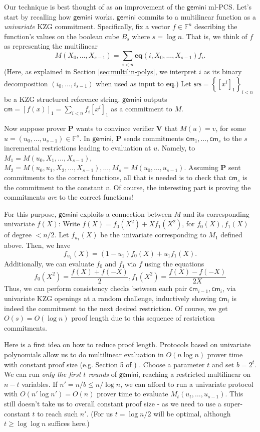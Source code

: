 \documentclass[11pt]{article} %
\newcommand{\gemini}{\ensuremath{\mathsf{gemini}}\xspace}
\newcommand{\F}{\ensuremath{\mathbb F}\xspace}
\newcommand{\srs}{\ensuremath{\mathsf{srs}}\xspace}
\newcommand{\cm}{\ensuremath{\mathsf{cm}}\xspace}
\newcommand{\sett}[2]{\ensuremath{\set{#1}_{#2}}\xspace}
\newcommand{\enc}[1]{\ensuremath{\left[#1\right]_1}\xspace}
\newcommand{\prv}{\ensuremath{\mathsf{\mathbf{P}}}\xspace}
\newcommand{\ver}{\ensuremath{\mathsf{\mathbf{V}}}\xspace}
\newcommand{\set}[1]{\ensuremath{\left\{#1\right\}}\xspace}
\newcommand{\sumi}[1]{\sum_{i< #1}}
\newcommand{\eq}{\ensuremath{\mathsf{eq}}\xspace}
\renewcommand{\eq}{\ensuremath{\mathbf{eq}}\xspace}
\newcommand{\B}[1]{\ensuremath{B_{#1}}\xspace}
\newcommand{\mlpcs}{ml-PCS\xspace}
\begin{document}
Our technique is best thought of as an improvement of the \gemini \mlpcs\cite{gemini}.
Let's start by recalling how \gemini works.
\gemini commits to a multilinear function as a \emph{univariate} KZG commitment\cite{kzg}. Specifically,
fix a vector $f\in \F^n$ describing the function's values on the boolean cube \B{s} where $s=\log n$. That is, we think of $f$ as representing the 
multilinear
\[M(X_0,\ldots,X_{s-1})= \sumi{n}\eq(i,X_0,\ldots,X_{s-1}) f_i.\]
(Here, as explained in Section \ref{sec:multilin-polys}, we interpret $i$ as its binary decomposition $(i_0,\ldots,i_{s-1})$
when used as input to \eq.)
Let $\srs =\sett{\enc{x^i}}{i<n}$be a KZG structured reference string.
 \gemini outputs $\cm=\enc{f(x)}=\sumi{n}f_i \enc{x^i}$ as a commitment to $M$.  


Now suppose prover \prv wants to convince verifier \ver  that $M(u)=v$, for some $u=(u_0,\ldots,u_{s-1})\in \F^s$. In \gemini, \prv sends commitments $\cm_1,\ldots,\cm_s$ to the $s$ incremental restrictions leading  to evaluation at $u$.
Namely, to $M_1=M(u_0,X_1,\ldots,X_{s-1})$, $M_2=M(u_0,u_1,X_2,\ldots,X_{s-1}),\ldots,M_s=M(u_0,\ldots,u_{s-1})$.
Assuming \prv sent commitments to the correct functions, all that is needed is to check that $\cm_s$ is the commitment to the constant $v$. Of course, the interesting part is proving the commitments \emph{are} to the correct functions!

For this purpose, \gemini exploits a connection between $M$ and its corresponding univariate $f(X)$:
Write $f(X)=f_0(X^2)+X f_1(X^2)$, for $f_0(X),f_1(X)$ of degree $<n/2$. Let $f_{u_1}(X)$ be the univariate corresponding to $M_1$ defined above. Then, we have
\[f_{u_1}(X)=(1-u_1)f_0(X)+ u_1 f_1(X).\]
Additionally, we can evaluate $f_0$ and $f_1$ via $f$  using the equations
\[f_0(X^2)=\frac{f(X)+f(-X)}{2}, f_1(X^2)=\frac{f(X)-f(-X)}{2X}\]
Thus, we can perform consistency checks between each pair $\cm_{i-1},\cm_i$, via univariate KZG openings at a random challenge, inductively showing $\cm_i$ is indeed the commitment to the next desired restriction.
Of course, we get $O(s)=O(\log n)$ proof length due to this sequence of restriction commitments.

Here is a first idea on how to reduce proof length.
Protocols based on univariate polynomials allow us to do multilinear evaluation in $O(n\log n)$ prover time with constant proof size (e.g. Section 5 of \cite{logupgkr}) .
Choose a parameter $t$ and set $b=2^t$.
We can run \emph{only the first $t$ rounds} of \gemini, reaching a restricted multilinear on $n-t$ variables.
If $n'=n/b\leq n/\log n$, we can afford to run a univariate protocol with $O(n' \log n')=O(n)$ prover time to evaluate $M_t(u_t,\ldots,u_{s-1})$.
This still doesn't take us to overall constant proof size - as we  need to use a super-constant $t$ to reach such $n'$. (For us $t=\log n/2$ will be optimal, although $t\geq \log \log n$ suffices here.)
\end{document}
